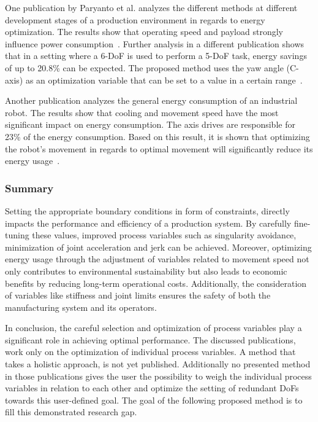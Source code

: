 \documentclass[conference]{IEEEtran}
\begin{document}
One publication by  Paryanto et al. analyzes the different methods at different development stages of a production environment in regards to energy optimization. The results show that operating speed and payload strongly influence power consumption~\cite{Paryanto.2015}. Further analysis in a different publication shows that in a setting where a 6-DoF is used to perform a 5-DoF task, energy savings of up to 20.8\% can be expected. The proposed method uses the yaw angle (C-axis) as an optimization variable that can be set to a value in a certain range~\cite{Boscariol.2020}. 

Another publication analyzes the general energy consumption of an industrial robot. The results show that cooling and movement speed have the most significant impact on energy consumption. The axis drives are responsible for 23\% of the energy consumption. Based on this result, it is shown that optimizing the robot's movement in regards to optimal movement will significantly reduce its energy usage~\cite{Uhlmann.2016}. \newline


\subsubsection{Summary}
Setting the appropriate boundary conditions in form of constraints, directly impacts the performance and efficiency of a production system. By carefully fine-tuning these values, improved process variables such as singularity avoidance, minimization of joint acceleration and jerk can be achieved. Moreover, optimizing energy usage through the adjustment of variables related to movement speed not only contributes to environmental sustainability but also leads to economic benefits by reducing long-term operational costs. Additionally, the consideration of variables like stiffness and joint limits ensures the safety of both the manufacturing system and its operators.


In conclusion, the careful selection and optimization of process variables play a significant role in achieving optimal performance. The discussed publications, work only on the optimization of individual process variables. A method that takes a holistic approach, is not yet published. Additionally no presented method in those publications gives the user the possibility to weigh the individual process variables in relation to each other and optimize the setting of redundant DoFs towards this user-defined goal. The goal of the following proposed method is to fill this demonstrated research gap.
\end{document}
